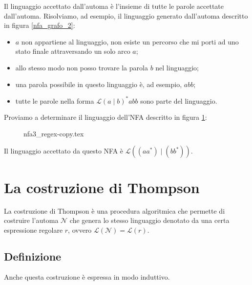 \documentclass[class=book, crop=false, oneside, 12pt]{standalone}
\begin{document}
Il linguaggio accettato dall’automa è l’insieme di tutte le parole accettate dall’automa.
Risolviamo, ad esempio, il linguaggio generato dall’automa descritto in figura \ref{nfa_grafo_2}:
\begin{itemize}
    \item \(a\) non appartiene al linguaggio, non esiste un percorso che mi porti ad uno stato finale attraversando un solo arco \(a\);
    \item allo stesso modo non posso trovare la parola \(b\) nel linguaggio;
    \item una parola possibile in questo linguaggio è, ad esempio, \(abb\);
    \item tutte le parole nella forma \(\mathcal{L}(a \mid b)^\ast abb\) sono parte del linguaggio.
\end{itemize}

\noindent Proviamo a determinare il linguaggio dell'NFA descritto in figura \ref{nfa_grafo_3}:

\begin{figure}[htb]
    \centering
    {nfa3_regex-copy.tex}
    \caption{}
    \label{nfa_grafo_3}
\end{figure}

\noindent Il linguaggio accettato da questo NFA è \(\mathcal{L}((a a^* ) \mid ( b b^\ast ))\).

\section{La costruzione di Thompson}
La costruzione di Thompson è una procedura algoritmica che permette di costruire l’automa \(\mathcal{N}\) che genera lo stesso linguaggio denotato da una certa espressione regolare \(r\), ovvero \(\mathcal{L}(\mathcal{N}) = \mathcal{L}(r)\).

\subsection{Definizione}
Anche questa costruzione è espressa in modo induttivo.
\end{document}
